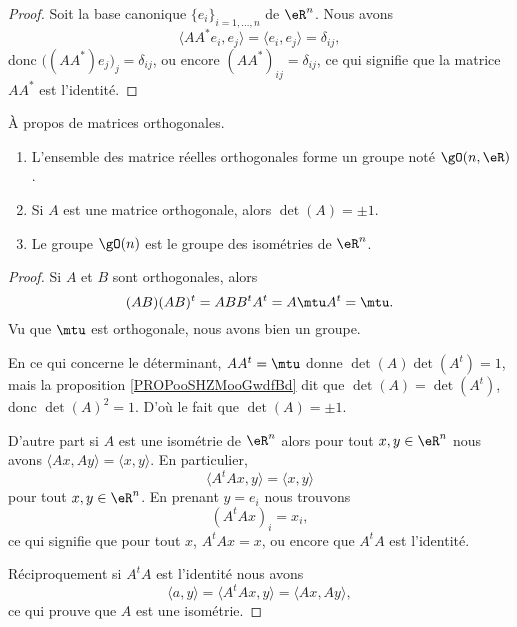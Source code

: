 \begin{proof}
    Soit la base canonique \( \{ e_i \}_{i=1,\ldots, n}\) de \( \eR^n\). Nous avons
    \begin{equation}
        \langle AA^*e_i, e_j\rangle =\langle e_i, e_j\rangle =\delta_{ij},
    \end{equation}
    donc \( \big( (AA^*)e_j \big)_j=\delta_{ij}\), ou encore \( (AA^*)_{ij}=\delta_{ij}\), ce qui signifie que la matrice $AA^*$ est l'identité.
\end{proof}

\begin{proposition}     \label{PropKBCXooOuEZcS}
    À propos de matrices orthogonales.
    \begin{enumerate}
        \item
            L'ensemble des matrice réelles orthogonales forme un groupe noté \( \gO(n,\eR)\).
        \item
            Si \( A\) est une matrice orthogonale, alors \( \det(A)=\pm 1\).
        \item       \label{ITEMooOWMBooHUatNb}
            Le groupe \( \gO(n)\) est le groupe des isométries de \( \eR^n\).
    \end{enumerate}
\end{proposition}

\begin{proof}
    Si \( A\) et \( B\) sont orthogonales, alors
    \begin{equation}
        (AB)(AB)^t=ABB^tA^t=A\mtu A^t=\mtu.
    \end{equation}
    Vu que \( \mtu\) est orthogonale, nous avons bien un groupe.

    En ce qui concerne le déterminant, \( AA^t=\mtu\) donne \( \det(A)\det(A^t)=1\), mais la proposition \ref{PROPooSHZMooGwdfBd} dit que \( \det(A)=\det(A^t)\), donc \( \det(A)^2=1\). D'où le fait que \( \det(A)=\pm 1\).

    D'autre part si \( A\) est une isométrie de \( \eR^n\) alors pour tout \( x,y\in \eR^n\) nous avons \( \langle Ax, Ay\rangle =\langle x, y\rangle \). En particulier,
    \begin{equation}
        \langle A^tAx, y\rangle =\langle x, y\rangle 
    \end{equation}
    pour tout \( x,y\in \eR^n\). En prenant \( y=e_i\) nous trouvons
    \begin{equation}
        (A^tAx)_i=x_i,
    \end{equation}
    ce qui signifie que pour tout \( x\), \( A^tAx=x\), ou encore que \( A^tA\) est l'identité.

    Réciproquement si \( A^tA\) est l'identité nous avons
    \begin{equation}
        \langle a, y\rangle =\langle A^tAx, y\rangle =\langle Ax, Ay\rangle ,
    \end{equation}
    ce qui prouve que \( A\) est une isométrie.
\end{proof}

